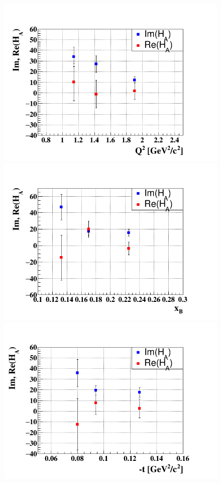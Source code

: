 \begin{figure}[h!]
\hspace{-0.5in}\includegraphics[scale=0.38]{fig_ch5/HA_Q2.png}
\hspace{-0.3in}\includegraphics[scale=0.38]{fig_ch5/HA_xB.png}
\centering \includegraphics[scale=0.38]{fig_ch5/HA_t.png}

\end{figure}
